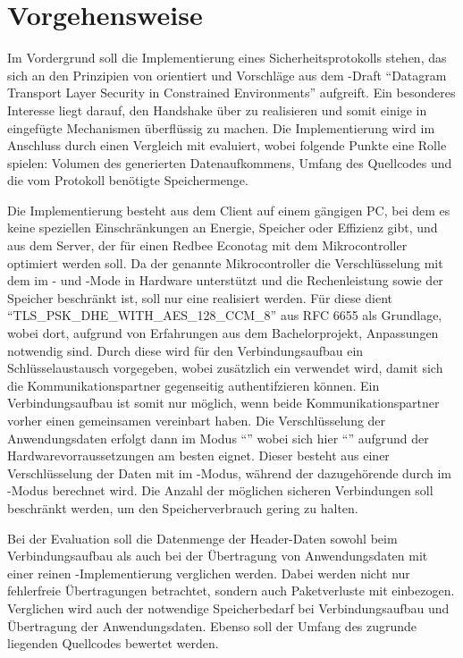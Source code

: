 \section{Vorgehensweise}

Im Vordergrund soll die Implementierung eines Sicherheitsprotokolls stehen, das sich an den Prinzipien von  orientiert
und Vorschläge aus dem -Draft "`Datagram Transport Layer Security in Constrained Environments"' \cite{draftcodtls} aufgreift.
Ein besonderes Interesse liegt darauf, den Handshake über  \cite{draftcoap13} zu realisieren und somit einige in  eingefügte
Mechanismen überflüssig zu machen. Die Implementierung wird im Anschluss durch einen Vergleich mit  evaluiert, wobei folgende Punkte eine
Rolle spielen: Volumen des generierten Datenaufkommens, Umfang des Quellcodes und die vom Protokoll benötigte Speichermenge.

Die Implementierung besteht aus dem Client auf einem gängigen PC, bei dem es keine speziellen Einschränkungen an Energie,
Speicher oder Effizienz gibt, und aus dem Server, der für einen Redbee Econotag \cite{econotag} mit dem  \cite{mc1322}
Mikrocontroller optimiert werden soll. Da der genannte Mikrocontroller die Verschlüsselung mit dem  im - und -Mode
in Hardware unterstützt und die Rechenleistung sowie der Speicher beschränkt ist, soll nur eine  realisiert werden.
Für diese dient "`TLS\_PSK\_DHE\_WITH\_AES\_128\_CCM\_8"' aus RFC 6655 \cite{rfc6655} als Grundlage, wobei dort, aufgrund von Erfahrungen
aus dem Bachelorprojekt, Anpassungen notwendig sind. Durch diese wird für den Verbindungsaufbau ein Schlüsselaustausch vorgegeben, wobei zusätzlich
ein  verwendet wird, damit sich die Kommunikationspartner gegenseitig authentifzieren können. Ein Verbindungsaufbau ist somit nur möglich,
wenn beide Kommunikationspartner vorher einen gemeinsamen  vereinbart haben. Die Verschlüsselung der Anwendungsdaten erfolgt dann im Modus
"`"' \cite{rfc5116} wobei sich hier "`"' \cite{rfc3610} aufgrund der Hardwarevorraussetzungen am besten eignet. Dieser besteht
aus einer Verschlüsselung der Daten mit  im -Modus, während der dazugehörende  durch  im -Modus
berechnet wird. Die Anzahl der möglichen sicheren Verbindungen soll beschränkt werden, um den Speicherverbrauch gering zu halten.

Bei der Evaluation soll die Datenmenge der Header-Daten sowohl beim Verbindungsaufbau als auch bei der Übertragung von Anwendungsdaten
mit einer reinen -Implementierung verglichen werden. Dabei werden nicht nur fehlerfreie Übertragungen betrachtet, sondern auch Paketverluste
mit einbezogen. Verglichen wird auch der notwendige Speicherbedarf bei Verbindungsaufbau und Übertragung der Anwendungsdaten.
Ebenso soll der Umfang des zugrunde liegenden Quellcodes bewertet werden.